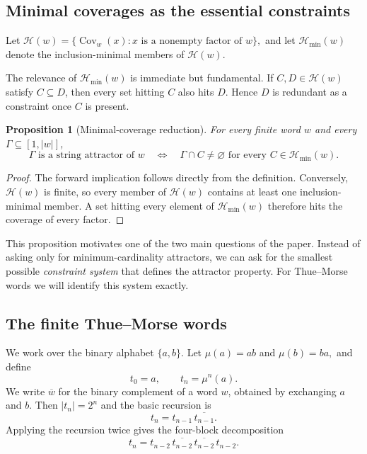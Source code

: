 \documentclass[11pt,a4paper]{article}
\newtheorem{proposition}[theorem]{Proposition}
\theoremstyle{definition}\newtheorem{definition}[theorem]{Definition}
\theoremstyle{remark}\newtheorem{remark}[theorem]{Remark}
\newcommand{\Cov}{\operatorname{Cov}}
\newcommand{\Hmin}{\mathcal{H}_{\min}}
\begin{document}
\subsection{Minimal coverages as the essential constraints}
Let
$
\mathcal H(w)=\{\Cov_w(x):x\text{ is a nonempty factor of }w\},
$
and let $\Hmin(w)$ denote the inclusion-minimal members of $\mathcal H(w)$.

The relevance of $\Hmin(w)$ is immediate but fundamental. If $C,D\in\mathcal H(w)$ satisfy $C\subseteq D$, then every set hitting $C$ also hits $D$. Hence $D$ is redundant as a constraint once $C$ is present.

\begin{proposition}[Minimal-coverage reduction]
\label{prop:minimal-coverage-reduction}
For every finite word $w$ and every $\Gamma\subseteq[1,|w|]$,
\[
\Gamma\text{ is a string attractor of }w
\quad\Longleftrightarrow\quad
\Gamma\cap C\neq\varnothing
\text{ for every }C\in\Hmin(w).
\]
\end{proposition}

\begin{proof}
The forward implication follows directly from the definition. Conversely, $\mathcal H(w)$ is finite, so every member of $\mathcal H(w)$ contains at least one inclusion-minimal member. A set hitting every element of $\Hmin(w)$ therefore hits the coverage of every factor.
\end{proof}

This proposition motivates one of the two main questions of the paper. Instead of asking only for minimum-cardinality attractors, we can ask for the smallest possible \emph{constraint system} that defines the attractor property. For Thue--Morse words we will identify this system exactly.

\subsection{The finite Thue--Morse words}
We work over the binary alphabet $\{a,b\}$. Let
$
\mu(a)=ab$ and
$
\mu(b)=ba,
$
and define
\[
t_0=a,\qquad t_n=\mu^n(a).
\]
We write $\overline{w}$ for the binary complement of a word $w$, obtained by exchanging $a$ and $b$. Then
$
|t_n|=2^n
$
and the basic recursion is
\begin{equation}
t_n=t_{n-1}\,\overline{t_{n-1}}.
\label{eq:tm-recursion}
\end{equation}
Applying the recursion twice gives the four-block decomposition
\begin{equation}
t_n=t_{n-2}\,\overline{t_{n-2}}\,\overline{t_{n-2}}\,t_{n-2}.
\label{eq:tm-four-block}
\end{equation}
\end{document}
